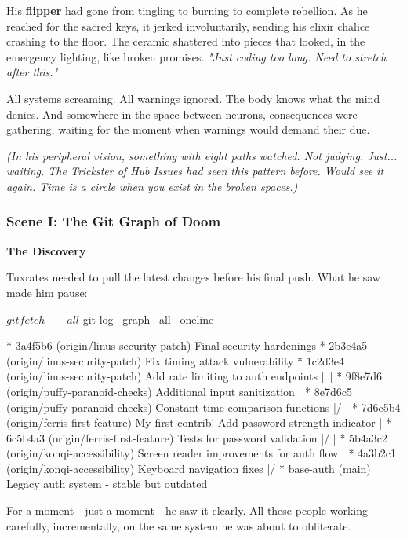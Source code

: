 His \textbf{flipper} had gone from tingling to burning to complete rebellion. As he reached for the sacred keys, it jerked involuntarily, sending his elixir chalice crashing to the floor. The ceramic shattered into pieces that looked, in the emergency lighting, like broken promises. \emph{"Just coding too long. Need to stretch after this."}

All systems screaming. All warnings ignored. The body knows what the mind denies. And somewhere in the space between neurons, consequences were gathering, waiting for the moment when warnings would demand their due.

\emph{(In his peripheral vision, something with eight paths watched. Not judging. Just... waiting. The Trickster of Hub Issues had seen this pattern before. Would see it again. Time is a circle when you exist in the broken spaces.)}

\bookdivider

\subsubsection{Scene I: The Git Graph of Doom}\label{scene-i-the-git-graph-of-doom}

\textbf{The Discovery}

Tuxrates needed to pull the latest changes before his final push. What he saw made him pause:

\begin{codeblock}
$ git fetch --all
$ git log --graph --all --oneline

* 3a4f5b6 (origin/linus-security-patch) Final security hardenings
* 2b3e4a5 (origin/linus-security-patch) Fix timing attack vulnerability
* 1c2d3e4 (origin/linus-security-patch) Add rate limiting to auth endpoints
|\
| * 9f8e7d6 (origin/puffy-paranoid-checks) Additional input sanitization
| * 8e7d6c5 (origin/puffy-paranoid-checks) Constant-time comparison functions
|/
| * 7d6c5b4 (origin/ferris-first-feature) My first contrib! Add password strength indicator
| * 6c5b4a3 (origin/ferris-first-feature) Tests for password validation
|/
| * 5b4a3c2 (origin/konqi-accessibility) Screen reader improvements for auth flow
| * 4a3b2c1 (origin/konqi-accessibility) Keyboard navigation fixes
|/
* base-auth (main) Legacy auth system - stable but outdated
\end{codeblock}

For a moment---just a moment---he saw it clearly. All these people working carefully, incrementally, on the same system he was about to obliterate.

